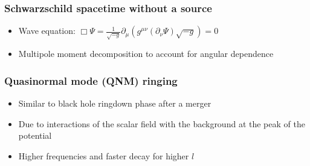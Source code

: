 \documentclass{beamer}
\begin{document}
\begin{frame}
  \frametitle{Schwarzschild spacetime without a source}
  \begin{itemize}
  \item Wave equation: $\Box\Psi=\frac{1}{\sqrt{-g}}\partial_\mu\left(g^{\mu\nu}(\partial_\nu\Psi)\sqrt{-g}\right)=0$
  \item Multipole moment decomposition to account for angular dependence
  \end{itemize}
\end{frame}
  
\begin{frame}
  \frametitle{Quasinormal mode (QNM) ringing}
  \begin{itemize}
  \item Similar to black hole ringdown phase after a merger
  \item Due to interactions of the scalar field with the background at the peak of the potential
  \item Higher frequencies and faster decay for higher $l$
  \end{itemize}
\end{frame}
\end{document}
